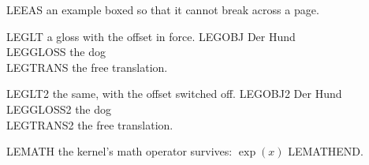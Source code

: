 \eas LEEAS an example boxed so that it cannot break across a page.
\zs

\ea LEGLT a gloss with the offset in force.
\gll LEGOBJ Der Hund\\
     LEGGLOSS the dog\\
\glt LEGTRANS the free translation.
\z

{\nogltOffset
\ea LEGLT2 the same, with the offset switched off.
\gll LEGOBJ2 Der Hund\\
     LEGGLOSS2 the dog\\
\glt LEGTRANS2 the free translation.
\z
}

LEMATH the kernel's math operator survives: $\exp(x)$ LEMATHEND.

